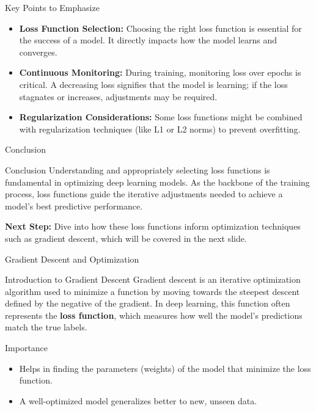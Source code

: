 \documentclass[aspectratio=169]{beamer}
\begin{document}
\begin{frame}[fragile]{Key Points to Emphasize}
    \begin{itemize}
        \item \textbf{Loss Function Selection:} Choosing the right loss function is essential for the success of a model. It directly impacts how the model learns and converges.
        \item \textbf{Continuous Monitoring:} During training, monitoring loss over epochs is critical. A decreasing loss signifies that the model is learning; if the loss stagnates or increases, adjustments may be required.
        \item \textbf{Regularization Considerations:} Some loss functions might be combined with regularization techniques (like L1 or L2 norms) to prevent overfitting.
    \end{itemize}
\end{frame}

\begin{frame}[fragile]{Conclusion}
    \begin{block}{Conclusion}
        Understanding and appropriately selecting loss functions is fundamental in optimizing deep learning models. As the backbone of the training process, loss functions guide the iterative adjustments needed to achieve a model's best predictive performance.
    \end{block}
    
    \textbf{Next Step:} Dive into how these loss functions inform optimization techniques such as gradient descent, which will be covered in the next slide.
\end{frame}

\begin{frame}[fragile]{Gradient Descent and Optimization}
    \begin{block}{Introduction to Gradient Descent}
        Gradient descent is an iterative optimization algorithm used to minimize a function by moving towards the steepest descent defined by the negative of the gradient. In deep learning, this function often represents the \textbf{loss function}, which measures how well the model's predictions match the true labels.
    \end{block}
    
    \begin{block}{Importance}
        \begin{itemize}
            \item Helps in finding the parameters (weights) of the model that minimize the loss function.
            \item A well-optimized model generalizes better to new, unseen data.
        \end{itemize}
    \end{block}
\end{frame}
\end{document}
